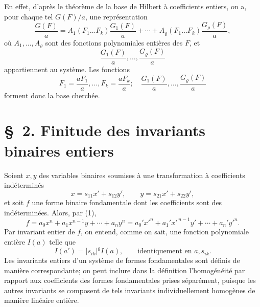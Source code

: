 En effet, d'après le théorème de la base de Hilbert à coefficients entiers, on a, pour chaque tel $G(F)/a$, une représentation
\[
 \frac{G(F)}{a}
 =
 A_1(F_1\ldots F_k)\frac{G_1(F)}{a}
 +\cdots+
 A_\varrho(F_1\ldots F_k)\frac{G_\varrho(F)}{a},
\]
où $A_1,\ldots,A_\varrho$ sont des fonctions polynomiales entières des $F$, et
\[
        \frac{G_1(F)}{a},\ldots,\frac{G_\varrho(F)}{a}
\]
appartiennent au système. Les fonctions
\[
        F_1=\frac{aF_1}{a},\ldots,F_k=\frac{aF_k}{a};
        \quad
        \frac{G_1(F)}{a},\ldots,\frac{G_\varrho(F)}{a}
\]
forment donc la base cherchée.

\setcounter{equation}{0}
\section*{\S\ 2. Finitude des invariants binaires entiers}

Soient $x,y$ des variables binaires soumises à une transformation à coefficients indéterminés
\begin{equation}
        x=s_{11}x'+s_{12}y',\qquad y=s_{21}x'+s_{22}y',
\end{equation}
et soit $f$ une forme binaire fondamentale dont les coefficients sont des indéterminées. Alors, par (1),
\begin{equation}
        f=a_0x^n+a_1x^{n-1}y+\cdots+a_ny^n
        =a_0'x'^n+a_1'x'^{\,n-1}y'+\cdots+a_n'y'^n.
\end{equation}
Par invariant entier de $f$, on entend, comme on sait, une fonction polynomiale entière $I(a)$ telle que
\begin{equation}
        I(a')=|s_{ik}|^\varrho I(a),\qquad \text{identiquement en $a,s_{ik}$}.
\end{equation}
Les invariants entiers d'un système de formes fondamentales sont définis de manière correspondante; on peut inclure dans la définition l'homogénéité par rapport aux coefficients des formes fondamentales prises séparément, puisque les autres invariants se composent de tels invariants individuellement homogènes de manière linéaire entière.

